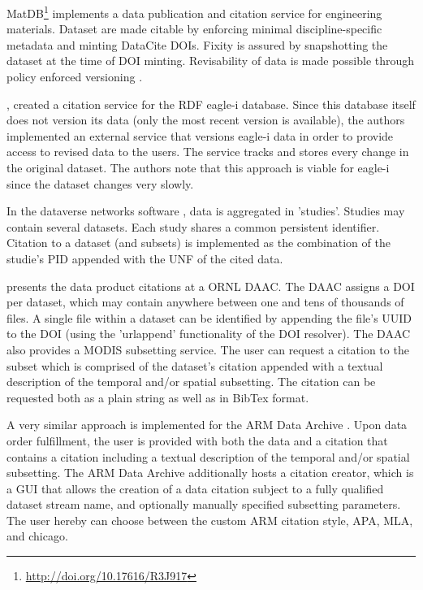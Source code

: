 \documentclass[letterpaper, twocolumn, parskip=half, fontsize=8pt, DIV=calc]{scrartcl}
\begin{document}
MatDB\footnote{\url{http://doi.org/10.17616/R3J917}} implements a data publication and citation service for engineering materials. Dataset are made citable by enforcing minimal discipline-specific metadata and minting DataCite DOIs. Fixity is assured by snapshotting the dataset at the time of DOI minting. Revisability of data is made possible through policy enforced versioning \citep{Austin2016}.

\cite{Alawini2017}, created a citation service for the \gls{RDF} eagle-i database. Since this database itself does not version its data (only the most recent version is available), the authors implemented an external service that versions eagle-i data in order to provide access to revised data to the users. The service tracks and stores every change in the original dataset.  The authors note that this approach is viable for eagle-i since the dataset changes very slowly.

In the dataverse networks software \citep{Crosas2011}, data is aggregated in 'studies'. Studies may contain several datasets. Each study shares a common persistent identifier. Citation to a dataset (and subsets) is implemented as the combination of the studie's \gls{PID} appended with the UNF of the cited data.

\cite{Cook2016} presents the data product citations at a \gls{ORNL} \gls{DAAC}. The DAAC assigns a \gls{DOI} per dataset, which may contain anywhere between one and tens of thousands of files. A single file within a dataset can be identified by appending the file's UUID to the DOI (using the 'urlappend' functionality of the DOI resolver). The DAAC also provides a MODIS subsetting service. The user can request a citation to the subset which is comprised of the dataset's citation appended with a textual description of the temporal and/or spatial subsetting. The citation can be requested both as a plain string as well as in BibTex format.

A very similar approach is implemented for the \gls{ARM} Data Archive \citep{Prakash2016}. Upon data order fulfillment, the user is provided with both the data and a citation that contains a citation including a textual description of the temporal and/or spatial subsetting. The \gls{ARM} Data Archive additionally hosts a citation creator, which is a \gls{GUI} that allows the creation of a data citation subject to a fully qualified dataset stream name, and optionally manually specified subsetting parameters. The user hereby can choose between the custom ARM citation style, APA, MLA, and chicago.
\end{document}

